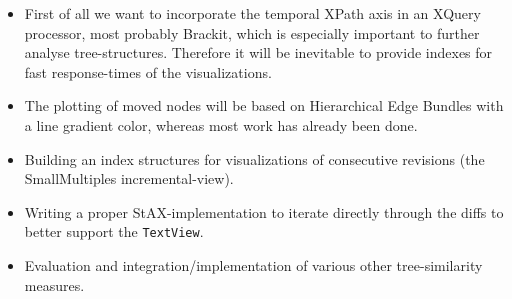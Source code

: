 \begin{itemize}
\item First of all we want to incorporate the temporal XPath axis in an XQuery processor, most probably Brackit\cite{Brackit}, which is especially important to further analyse tree-structures. Therefore it will be inevitable to provide indexes for fast response-times of the visualizations.
\item The plotting of moved nodes will be based on Hierarchical Edge Bundles with a line gradient color, whereas most work has already been done.
\item Building an index structures for visualizations of consecutive revisions (the SmallMultiples incremental-view).
\item Writing a proper StAX-implementation to iterate directly through the diffs to better support the \texttt{TextView}.
\item Evaluation and integration/implementation of various other tree-similarity measures.
\end{itemize} 
